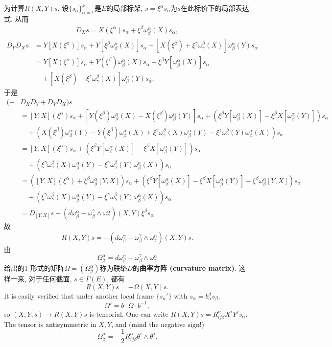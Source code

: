 为计算$R(X,Y)s$, 设$\{s_\alpha\}_{\alpha=1}^k$是$E$的局部标架, $s=\xi^\alpha s_\alpha$为$s$在此标价下的局部表达式. 从而
$$
\begin{aligned}
D_Xs=X(\xi^\alpha)s_\alpha+\xi^\beta\omega_\beta^\alpha(X) s_\alpha,
\end{aligned}
$$
$$
\begin{aligned}
D_YD_Xs&=Y[X(\xi^\alpha)]s_\alpha+Y[\xi^\beta\omega_\beta^\alpha(X)] s_\alpha
+[X(\xi^\beta)+\xi^\gamma\omega_\gamma^\beta(X)]\omega_\beta^\alpha(Y) s_\alpha \\
&=Y[X(\xi^\alpha)]s_\alpha+Y(\xi^\beta)\omega_\beta^\alpha(X)s_\alpha+\xi^\beta Y[\omega_\beta^\alpha(X)]s_\alpha\\
&\quad+[X(\xi^\beta)+\xi^\gamma\omega_\gamma^\beta(X)]\omega_\beta^\alpha(Y) s_\alpha ,
\end{aligned}
$$
于是
$$
\begin{aligned}
(-&D_XD_Y+D_YD_X)s\\
&=[Y,X](\xi^\alpha)s_\alpha
+[Y(\xi^\beta)\omega_\beta^\alpha(X)-X(\xi^\beta)\omega_\beta^\alpha(Y)]s_\alpha+\left(\xi^\beta Y[\omega_\beta^\alpha(X)]-\xi^\beta X[\omega_\beta^\alpha(Y)]\right)s_\alpha\\
&\quad+\left(X(\xi^\beta)\omega_\beta^\alpha(Y)-Y(\xi^\beta)\omega_\beta^\alpha(X)+\xi^\gamma\omega_\gamma^\beta(X)\omega_\beta^\alpha(Y)-\xi^\gamma\omega_\gamma^\beta(Y)\omega_\beta^\alpha(X) \right)s_\alpha\\
&=[Y,X](\xi^\alpha)s_\alpha+\left(\xi^\beta Y[\omega_\beta^\alpha(X)]-\xi^\beta X[\omega_\beta^\alpha(Y)]\right)s_\alpha\\
&\quad+\left(\xi^\gamma\omega_\gamma^\beta(X)\omega_\beta^\alpha(Y)-\xi^\gamma\omega_\gamma^\beta(Y)\omega_\beta^\alpha(X) \right)s_\alpha\\
&=\left([Y,X](\xi^\alpha)+\xi^\beta\omega_\beta^\alpha[Y,X]\right)s_\alpha
+\left(\xi^\beta Y[\omega_\beta^\alpha(X)]-\xi^\beta X[\omega_\beta^\alpha(Y)]-\xi^\beta\omega_\beta^\alpha[Y,X]\right)s_\alpha\\
&\quad+\left(\xi^\gamma\omega_\gamma^\beta(X)\omega_\beta^\alpha(Y)-\xi^\gamma\omega_\gamma^\beta(Y)\omega_\beta^\alpha(X) \right)s_\alpha\\
&=D_{[Y,X]}s-(d\omega_\beta^\alpha-\omega_\beta^\gamma\wedge\omega_\gamma^\alpha)(X,Y)\xi^\beta s_\alpha.
\end{aligned}
$$
故
$$
R(X,Y)s=-(d\omega_\beta^\alpha-\omega_\beta^\gamma\wedge\omega_\gamma^\alpha)(X,Y)s.
$$
由
$$
\Omega_\beta^\alpha=d\omega_\beta^\alpha-\omega_\beta^\gamma\wedge\omega_\gamma^\alpha
$$
给出的1-形式的矩阵$\Omega=(\Omega_\beta^\alpha)$称为联络$D$的\textbf{曲率方阵 (curvature matrix)}. 这样一来, 对于任何截面, $s\in\Gamma(E)$, 都有
$$
R(X,Y)s=-\Omega(X,Y)s.
$$
It is easily verified that under another local frame $\{s_\alpha'\}$ with $s_\alpha=b_\alpha^\beta s_\beta$,
$$\Omega'=b\cdot\Omega \cdot b^{-1},$$
so $(X,Y,s)\to R(X,Y)s$ is tensorial. One can write $R(X,Y)s=R^\alpha_{ij\beta}X^iY^js_\alpha$. The tensor is antisymmetric in $X,Y$, and (mind the negative sign!)
$$\Omega_\beta^\alpha=-\frac{1}{2}R^\alpha_{ij\beta}\theta^i\wedge\theta^j.$$

